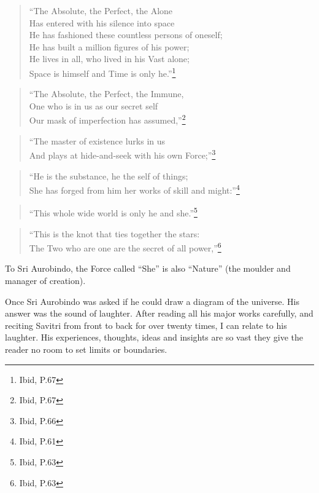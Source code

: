 \documentclass[12pt,a4paper]{book}
\begin{document}
\begin{verse}
``The Absolute, the Perfect, the Alone\\
Has entered with his silence into space\\
He has fashioned these countless persons of oneself;\\
He has built a million figures of his power;\\
He lives in all, who lived in his Vast alone;\\
Space is himself and Time is only he.''\footnote{Ibid, P.67}
\end{verse}

\begin{verse}
``The Absolute, the Perfect, the Immune,\\
One who is in us as our secret self\\
Our mask of imperfection has assumed,''\footnote{Ibid, P.67}
\end{verse}

\begin{verse}
``The master of existence lurks in us\\
And plays at hide-and-seek with his own Force;''\footnote{Ibid, P.66}
\end{verse}

\begin{verse}
``He is the substance, he the self of things;\\
She has forged from him her works of skill and might:''\footnote{Ibid, P.61}
\end{verse}

\begin{verse}
``This whole wide world is only he and she.''\footnote{Ibid, P.63}
\end{verse}

\begin{verse}
``This is the knot that ties together the stars:\\
The Two who are one are the secret of all power,''\footnote{Ibid, P.63}
\end{verse}

To Sri Aurobindo, the Force called ``She'' is also ``Nature'' (the
moulder and manager of creation).

Once Sri Aurobindo was asked if he could draw a diagram of the
universe. His answer was the sound of laughter. After reading all his
major works carefully, and reciting Savitri from front to back for
over twenty times, I can relate to his laughter. His experiences,
thoughts, ideas and insights are so vast they give the reader no room
to set limits or boundaries.
\end{document}
